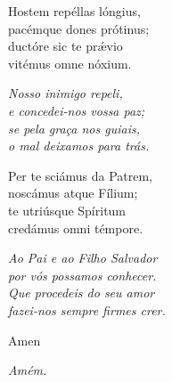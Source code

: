 \begin{paracol}{2}
  \switchcolumn*

  Hostem repéllas lóngius, \\
  pacémque dones prótinus; \\
  ductóre sic te pr\'{\ae}vio \\
  vitémus omne nóxium.

  \switchcolumn

  \emph{Nosso inimigo repeli, \\
    e concedei-nos vossa paz; \\
    se pela graça nos guiais, \\
    o mal deixamos para trás.}

  \switchcolumn*

  Per te sciámus da Patrem, \\
  noscámus atque Fílium; \\
  te utriúsque Spíritum \\
  credámus omni témpore.

  \switchcolumn

  \emph{Ao Pai e ao Filho Salvador \\
    por vós possamos conhecer. \\
    Que procedeis do seu amor \\
    fazei-nos sempre firmes crer.}

  \switchcolumn*

  Amen

  \switchcolumn

  \emph{Amém.}
\end{paracol}